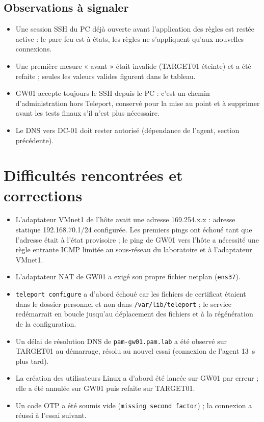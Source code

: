 \documentclass[11pt,a4paper]{report}
\begin{document}
\subsection{Observations à signaler}
\begin{itemize}
\item Une session SSH du PC déjà ouverte avant l'application des règles est restée active : le pare-feu est à états, les règles ne s'appliquent qu'aux nouvelles connexions.
\item Une première mesure « avant » était invalide (TARGET01 éteinte) et a été refaite ; seules les valeurs valides figurent dans le tableau.
\item GW01 accepte toujours le SSH depuis le PC : c'est un chemin d'administration hors Teleport, conservé pour la mise au point et à supprimer avant les tests finaux s'il n'est plus nécessaire.
\item Le DNS vers DC-01 doit rester autorisé (dépendance de l'agent, section précédente).
\end{itemize}

\section{Difficultés rencontrées et corrections}
\begin{itemize}
\item L'adaptateur VMnet1 de l'hôte avait une adresse 169.254.x.x : adresse statique 192.168.70.1/24 configurée. Les premiers pings ont échoué tant que l'adresse était à l'état provisoire ; le ping de GW01 vers l'hôte a nécessité une règle entrante ICMP limitée au sous-réseau du laboratoire et à l'adaptateur VMnet1.
\item L'adaptateur NAT de GW01 a exigé son propre fichier netplan (\texttt{ens37}).
\item \texttt{teleport configure} a d'abord échoué car les fichiers de certificat étaient dans le dossier personnel et non dans \texttt{/var/lib/teleport} ; le service redémarrait en boucle jusqu'au déplacement des fichiers et à la régénération de la configuration.
\item Un délai de résolution DNS de \texttt{pam-gw01.pam.lab} a été observé sur TARGET01 au démarrage, résolu au nouvel essai (connexion de l'agent 13~s plus tard).
\item La création des utilisateurs Linux a d'abord été lancée sur GW01 par erreur ; elle a été annulée sur GW01 puis refaite sur TARGET01.
\item Un code OTP a été soumis vide (\texttt{missing second factor}) ; la connexion a réussi à l'essai suivant.
\end{itemize}
\end{document}
